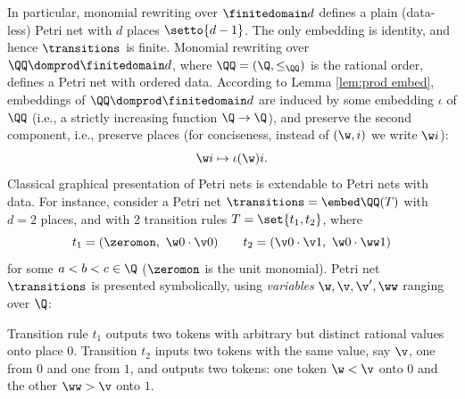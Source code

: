 \begin{slexample}
In particular, monomial rewriting over $\finitedomain d$ defines a plain (data-less) Petri net with 
$d$ places $\setto {d-1}$. 
The only embedding is identity, and hence $\transitions$ is finite.
Monomial rewriting over $\QQ\domprod \finitedomain d$,
where $\QQ=(\Q, \leq_\QQ)$ is the rational order,  defines a Petri net with ordered data.
According to Lemma \ref{lem:prod embed},
embeddings of $\QQ \domprod \finitedomain d$ are induced by some embedding 
$\iota$ of $\QQ$ (i.e., a strictly increasing function $\Q\to\Q$), 
and preserve the second component, i.e., preserve places
(for conciseness, instead of $(\w,i)$ we write $\w i$):
\[
\w i \mapsto \iota(\w) i.
\]
%
Classical graphical presentation of Petri nets is extendable to Petri nets with data.
For instance, consider a Petri net $\transitions = \embed \QQ(T)$ with $d=2$ places, 
and with 2 transition rules $T = \set{t_1, t_2}$, where
\[
t_1 = (\zeromon, \ \w0 \cdot \v0) \qquad
t_2 = (\v0 \cdot \v1, \ \w0 \cdot \ww1)
\]
for some $a<b<c\in\Q$ ($\zeromon$ is the unit monomial).
Petri net $\transitions$ is presented symbolically,
using \emph{variables} $\w,\v,\v', \ww$ ranging over $\Q$:

\begin{center}
\end{center}

Transition rule $t_1$ outputs two tokens with arbitrary but distinct rational values onto place $0$. 
Transition $t_2$ inputs two tokens with the same value, say $\v$, one from $0$ and one from $1$, and outputs two tokens:  one token $\w<\v$ onto $0$ and the other $\ww>\v$ onto $1$.
\end{slexample}

